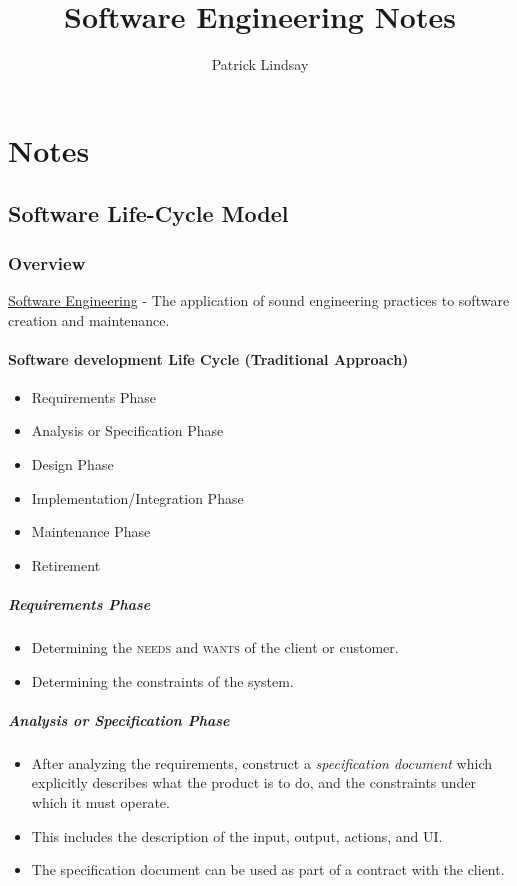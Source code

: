 \documentclass{report}
\author{Patrick Lindsay}
\title{Software Engineering Notes}
\begin{document}
\maketitle
\tableofcontents
\newpage
\part{Notes}
\chapter{Software Life-Cycle Model}
	\section{Overview}
	\underline{Software Engineering} - The application of sound engineering practices to software creation and maintenance.
		\subsection{Software development Life Cycle (Traditional Approach)}
			\begin{itemize}
				\item Requirements Phase
				\item Analysis or Specification Phase
				\item Design Phase
				\item Implementation/Integration Phase
				\item Maintenance Phase
				\item Retirement
			\end{itemize}
		\subsubsection{Requirements Phase}
			\begin{itemize}
				\item Determining the \textsc{needs} and \textsc{wants} of the client or customer.
				\item Determining the constraints of the system.
			\end{itemize}
		\subsubsection{Analysis or Specification Phase}
			\begin{itemize}
				\item After analyzing the requirements, construct a \emph{specification document} which explicitly describes what the product is to do, and the constraints under which it must operate.
				\item This includes the description of the input, output, actions, and UI.
				\item The specification document can be used as part of a contract with the client.
			\end{itemize}
\end{document}
